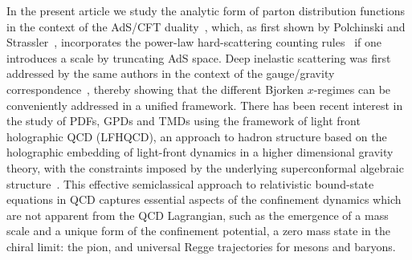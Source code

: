 \documentclass[aps,prd,preprint,groupedaddress]{revtex4-1}
\begin{document}
In the present article we study the analytic form of parton distribution functions in the context of the AdS/CFT duality~\cite{Maldacena:1997re}, which, as first shown by Polchinski and Strassler~\cite{Polchinski:2001tt}, incorporates the power-law hard-scattering counting rules~\cite{Brodsky:1973kr, Matveev:ra} if one introduces a scale by truncating AdS space.  Deep inelastic scattering was first addressed by the same authors in the context of the gauge/gravity correspondence~\cite{Polchinski:2002jw}, thereby showing that the different Bjorken $x$-regimes can be conveniently addressed in a unified framework.  There has been recent interest in the study of PDFs,  GPDs and TMDs using  the framework of light front holographic QCD (LFHQCD), an approach to hadron structure based on the holographic embedding of light-front dynamics in a higher dimensional gravity theory, with the constraints imposed by the underlying superconformal algebraic structure~\cite{Brodsky:2006uqa, deTeramond:2008ht, deTeramond:2013it, deTeramond:2014asa, Dosch:2015nwa, Brodsky:2014yha}. This effective semiclassical approach to relativistic bound-state equations in QCD captures essential aspects of the confinement dynamics which are not apparent from the QCD Lagrangian, such as the emergence of a mass scale and a unique form of the confinement potential, a zero mass state in the chiral limit: the pion, and universal Regge trajectories for mesons and baryons.
\end{document}
